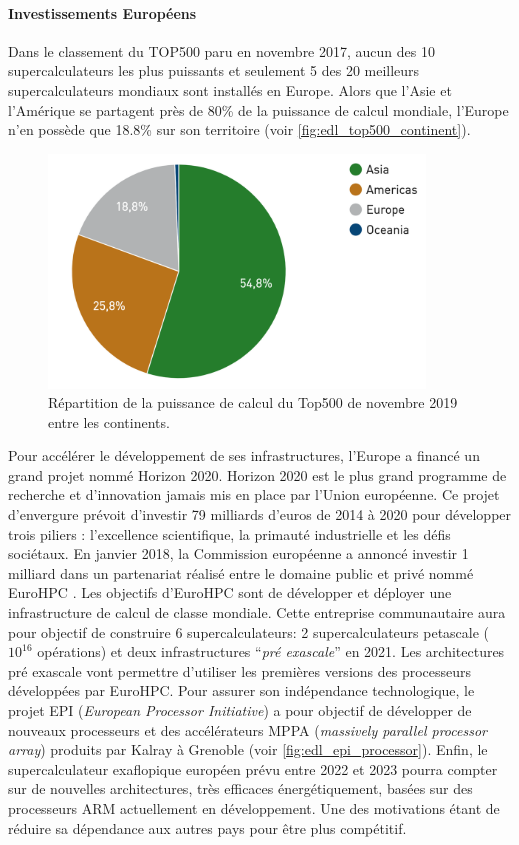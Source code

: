    \paragraph{Investissements Européens} Dans le classement du TOP500 paru en novembre 2017, aucun des 10 supercalculateurs les plus puissants et seulement 5 des 20 meilleurs supercalculateurs mondiaux sont installés en Europe. Alors que l'Asie et l'Amérique se partagent près de 80\% de la puissance de calcul mondiale, l’Europe n'en possède que  18.8\% sur son territoire (voir \autoref{fig:edl_top500_continent}).
    
    \begin{figure}
        \center
        \includegraphics[width=10cm]{images/edl_top500_continent.png}
        \caption{\label{fig:edl_top500_continent} Répartition de la puissance de calcul du Top500 de novembre 2019 entre les continents.}
    \end{figure}
    
    
    Pour accélérer le développement de ses infrastructures, l’Europe a financé un grand projet nommé Horizon 2020. Horizon 2020 est le plus grand programme de recherche et d'innovation jamais mis en place par l'Union européenne. Ce projet d’envergure prévoit d’investir 79 milliards d’euros de 2014 à 2020 pour développer trois piliers : l'excellence scientifique, la primauté industrielle et les défis sociétaux.
    En janvier 2018, la Commission européenne a annoncé investir 1 milliard dans un partenariat réalisé entre le domaine public et privé nommé EuroHPC \cite{EuroHPC2018}. Les objectifs d'EuroHPC sont de développer et déployer une infrastructure de calcul de classe mondiale. 
    Cette entreprise communautaire aura pour objectif de construire 6 supercalculateurs: 2 supercalculateurs petascale ($10^{16}$ opérations) et deux infrastructures ``\textit{pré exascale}'' en 2021. Les architectures pré exascale vont permettre d'utiliser les premières versions des processeurs développées par EuroHPC. Pour assurer son indépendance technologique, le projet EPI (\textit{European Processor Initiative}) a pour objectif de développer de nouveaux processeurs et des accélérateurs MPPA (\textit{massively parallel processor array}) produits par Kalray à Grenoble (voir \autoref{fig:edl_epi_processor}). Enfin, le supercalculateur exaflopique européen prévu entre 2022 et 2023 pourra compter sur de nouvelles architectures, très efficaces énergétiquement, basées sur des processeurs ARM actuellement en développement. Une des motivations étant de réduire sa dépendance aux autres pays pour être plus compétitif.  

